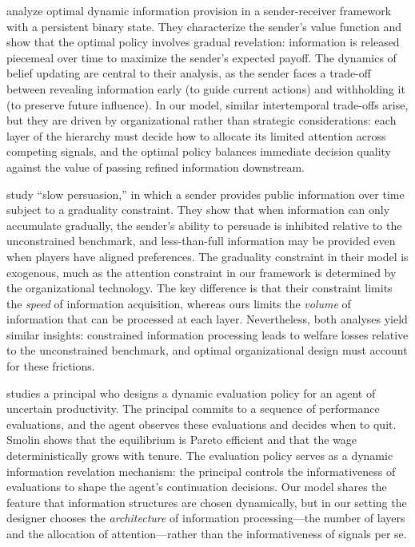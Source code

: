 \citet{renault2017optimal} analyze optimal dynamic information provision in a sender-receiver framework with a persistent binary state. They characterize the sender's value function and show that the optimal policy involves gradual revelation: information is released piecemeal over time to maximize the sender's expected payoff. The dynamics of belief updating are central to their analysis, as the sender faces a trade-off between revealing information early (to guide current actions) and withholding it (to preserve future influence). In our model, similar intertemporal trade-offs arise, but they are driven by organizational rather than strategic considerations: each layer of the hierarchy must decide how to allocate its limited attention across competing signals, and the optimal policy balances immediate decision quality against the value of passing refined information downstream.

\citet{escude2023slow} study ``slow persuasion,'' in which a sender provides public information over time subject to a graduality constraint. They show that when information can only accumulate gradually, the sender's ability to persuade is inhibited relative to the unconstrained benchmark, and less-than-full information may be provided even when players have aligned preferences. The graduality constraint in their model is exogenous, much as the attention constraint in our framework is determined by the organizational technology. The key difference is that their constraint limits the \emph{speed} of information acquisition, whereas ours limits the \emph{volume} of information that can be processed at each layer. Nevertheless, both analyses yield similar insights: constrained information processing leads to welfare losses relative to the unconstrained benchmark, and optimal organizational design must account for these frictions.

\citet{smolin2021dynamic} studies a principal who designs a dynamic evaluation policy for an agent of uncertain productivity. The principal commits to a sequence of performance evaluations, and the agent observes these evaluations and decides when to quit. Smolin shows that the equilibrium is Pareto efficient and that the wage deterministically grows with tenure. The evaluation policy serves as a dynamic information revelation mechanism: the principal controls the informativeness of evaluations to shape the agent's continuation decisions. Our model shares the feature that information structures are chosen dynamically, but in our setting the designer chooses the \emph{architecture} of information processing---the number of layers and the allocation of attention---rather than the informativeness of signals per se.

